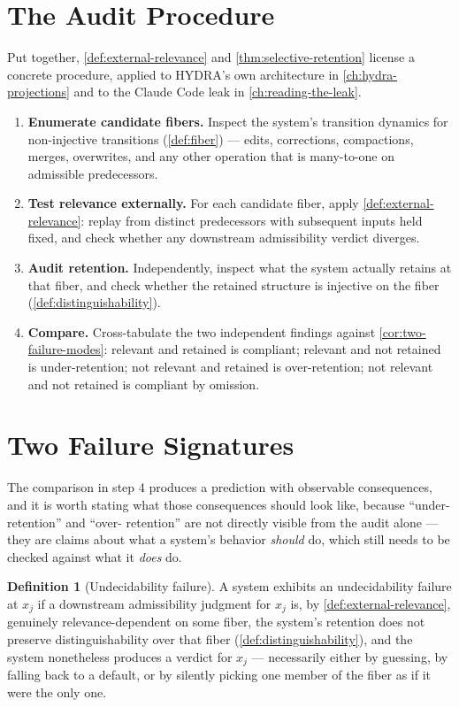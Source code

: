 \documentclass[11pt]{book}
\theoremstyle{plain}
\theoremstyle{definition}
\newtheorem{definition}[theorem]{Definition}
\theoremstyle{remark}
\begin{document}
\section{The Audit Procedure}

Put together, \cref{def:external-relevance} and
\cref{thm:selective-retention} license a concrete procedure,
applied to HYDRA's own architecture in \cref{ch:hydra-projections} and
to the Claude Code leak in \cref{ch:reading-the-leak}.

\begin{enumerate}
\item \textbf{Enumerate candidate fibers.} Inspect the system's
transition dynamics for non-injective transitions
(\cref{def:fiber}) --- edits, corrections, compactions, merges,
overwrites, and any other operation that is many-to-one on admissible
predecessors.
\item \textbf{Test relevance externally.} For each candidate fiber,
apply \cref{def:external-relevance}: replay from distinct
predecessors with subsequent inputs held fixed, and check whether any
downstream admissibility verdict diverges.
\item \textbf{Audit retention.} Independently, inspect what the
system actually retains at that fiber, and check whether the retained
structure is injective on the fiber (\cref{def:distinguishability}).
\item \textbf{Compare.} Cross-tabulate the two independent findings
against \cref{cor:two-failure-modes}: relevant and retained is
compliant; relevant and not retained is under-retention; not relevant
and retained is over-retention; not relevant and not retained is
compliant by omission.
\end{enumerate}

\section{Two Failure Signatures}

The comparison in step 4 produces a prediction with observable
consequences, and it is worth stating what those consequences should
look like, because \enquote{under-retention} and \enquote{over-
retention} are not directly visible from the audit alone --- they are
claims about what a system's behavior \emph{should} do, which still
needs to be checked against what it \emph{does} do.

\begin{definition}[Undecidability failure]
\label{def:undecidability-failure}
A system exhibits an undecidability failure at $x_j$ if a downstream
admissibility judgment for $x_j$ is, by \cref{def:external-relevance},
genuinely relevance-dependent on some fiber, the system's retention
does not preserve distinguishability over that fiber
(\cref{def:distinguishability}), and the system nonetheless produces a
verdict for $x_j$ --- necessarily either by guessing, by falling back
to a default, or by silently picking one member of the fiber as if it
were the only one.
\end{definition}
\end{document}
